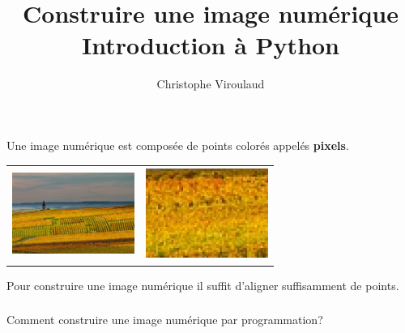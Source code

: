 \documentclass[svgnames,11pt]{beamer}
\author[]{Christophe Viroulaud}
\title{Construire une image numérique\\Introduction à Python}
\date{\framebox{\textbf{Phot 02}}}
\institute{Seconde - SNT}
\begin{document}
\begin{frame}
\titlepage
\end{frame}
\begin{frame}
    \frametitle{}
Une image numérique est composée de points colorés appelés \textbf{pixels}.
   \begin{center}
       \begin{tabular}{cc}
           \includegraphics[width=4cm,height=3cm]{ressources/vigne.jpg}
           &
           \includegraphics[width=4cm,height=3cm]{ressources/vigne-pixel.png}
       \end{tabular}
   \end{center} 
Pour construire une image numérique il suffit d'aligner suffisamment de points.
\end{frame}
\begin{frame}
    \frametitle{}

    \begin{framed}\centering 
        Comment construire une image numérique par programmation?
    \end{framed}

\end{frame}
\end{document}
